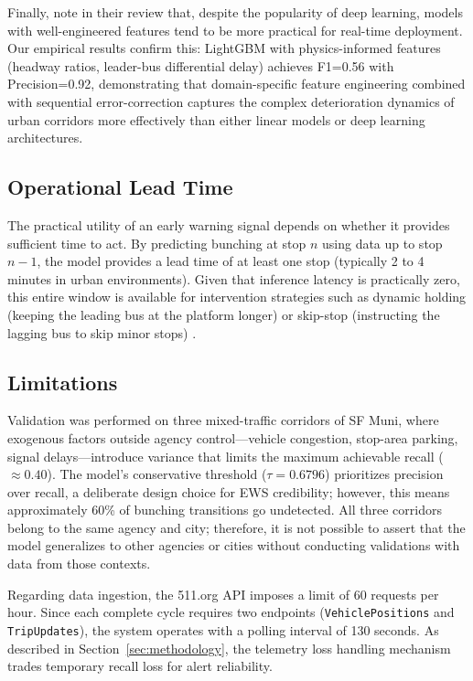 \documentclass[fleqn,10pt,lineno]{wlpeerj}
\begin{document}
Finally, \citet{21} note in their review that, despite the popularity of deep learning, models with well-engineered features tend to be more practical for real-time deployment. Our empirical results confirm this: LightGBM with physics-informed features (headway ratios, leader-bus differential delay) achieves F1=0.56 with Precision=0.92, demonstrating that domain-specific feature engineering combined with sequential error-correction captures the complex deterioration dynamics of urban corridors more effectively than either linear models or deep learning architectures.

\subsection{Operational Lead Time}

The practical utility of an early warning signal depends on whether it provides sufficient time
to act. By predicting bunching at stop $n$ using data up to stop $n{-}1$, the model provides a
lead time of at least one stop (typically 2 to 4 minutes in urban environments). Given that
inference latency is practically zero, this entire window is available for intervention
strategies such as dynamic holding (keeping the leading bus at the platform longer) or
skip-stop (instructing the lagging bus to skip minor stops) \citep{10}.

\subsection{Limitations}

Validation was performed on three mixed-traffic corridors of SF Muni, where exogenous factors
outside agency control---vehicle congestion, stop-area parking, signal delays---introduce
variance that limits the maximum achievable recall ($\approx 0.40$). The model's conservative threshold ($\tau=0.6796$) prioritizes precision over recall, a deliberate design choice for EWS credibility; however, this means approximately 60\% of bunching transitions go undetected. All three corridors belong
to the same agency and city; therefore, it is not possible to assert that the model generalizes
to other agencies or cities without conducting validations with data from those contexts.

Regarding data ingestion, the 511.org API imposes a limit of 60 requests per hour. Since each
complete cycle requires two endpoints (\texttt{VehiclePositions} and \texttt{TripUpdates}),
the system operates with a polling interval of 130 seconds. As described in
Section~\ref{sec:methodology}, the telemetry loss handling mechanism trades temporary recall
loss for alert reliability.
\end{document}

